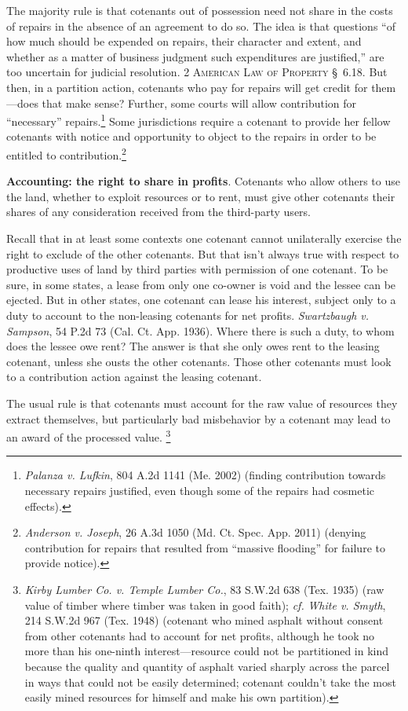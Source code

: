 The majority rule is that cotenants out of possession need not share in the
costs of repairs in the absence of an agreement to do so. The idea is that
questions ``of how much should be expended on repairs, their character and
extent, and whether as a matter of business judgment such expenditures are
justified,'' are too uncertain for judicial resolution. 2 \textsc{American Law
of Property} \S~6.18. But then, in a partition action, cotenants who pay for
repairs will get credit for them---does that make sense? Further, some courts
will allow contribution for ``necessary'' repairs.\footnote{\emph{Palanza v.
Lufkin}, 804 A.2d 1141 (Me. 2002) (finding contribution towards necessary
repairs justified, even though some of the repairs had cosmetic effects).} Some
jurisdictions require a cotenant to provide her fellow cotenants with notice and
opportunity to object to the repairs in order to be entitled to
contribution.\footnote{\emph{Anderson v. Joseph}, 26 A.3d 1050 (Md. Ct. Spec.
App. 2011) (denying contribution for repairs that resulted from ``massive
flooding'' for failure to provide notice).}



\item \textbf{Accounting: the right to share in profits}. Cotenants who allow
others to use the land, whether to exploit resources or to rent, must give
other cotenants their shares of any consideration received from the third-party
users.


Recall that in at least some contexts one cotenant cannot unilaterally exercise
the right to exclude of the other cotenants. But that isn't always true with
respect to productive uses of land by third parties with permission of one
cotenant. To be sure, in some states, a lease from only one co-owner is void
and the lessee can be ejected. But in other states, one cotenant can lease his
interest, subject only to a duty to account to the non-leasing cotenants for
net profits. \emph{Swartzbaugh v. Sampson}, 54 P.2d 73 (Cal. Ct. App. 1936).
Where there is such a duty, to whom does the lessee owe rent? The answer is that
she only owes rent to the leasing cotenant, unless she ousts the other
cotenants. Those other cotenants must look to a contribution action against the
leasing cotenant.



The usual rule is that cotenants must account for the raw value of resources
they extract themselves, but particularly bad misbehavior by a cotenant may lead
to an award of the processed value. \footnote{\emph{Kirby Lumber Co. v. Temple
Lumber Co.}, 83 S.W.2d 638 (Tex. 1935) (raw value of timber where timber was
taken in good faith); \emph{cf.} \emph{White v. Smyth}, 214 S.W.2d 967 (Tex.
1948) (cotenant who mined asphalt without consent from other cotenants had to
account for net profits, although he took no more than his one-ninth
interest---resource could not be partitioned in kind because the quality and
quantity of asphalt varied sharply across the parcel in ways that could not be
easily determined; cotenant couldn't take the most easily mined resources for
himself and make his own partition).}

